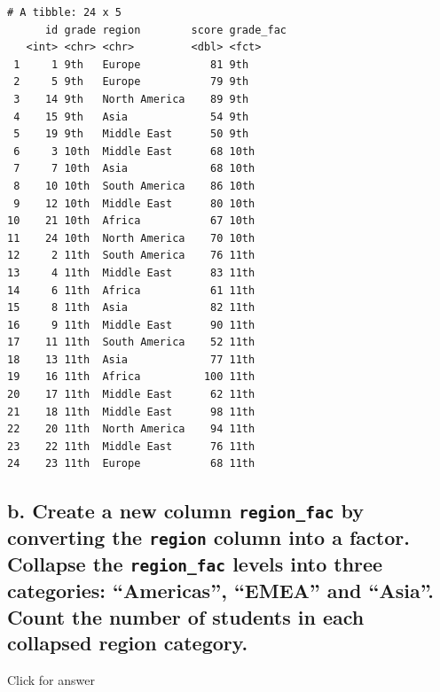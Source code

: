 \documentclass[
]{book}
\begin{document}
\begin{verbatim}
# A tibble: 24 x 5
      id grade region        score grade_fac
   <int> <chr> <chr>         <dbl> <fct>    
 1     1 9th   Europe           81 9th      
 2     5 9th   Europe           79 9th      
 3    14 9th   North America    89 9th      
 4    15 9th   Asia             54 9th      
 5    19 9th   Middle East      50 9th      
 6     3 10th  Middle East      68 10th     
 7     7 10th  Asia             68 10th     
 8    10 10th  South America    86 10th     
 9    12 10th  Middle East      80 10th     
10    21 10th  Africa           67 10th     
11    24 10th  North America    70 10th     
12     2 11th  South America    76 11th     
13     4 11th  Middle East      83 11th     
14     6 11th  Africa           61 11th     
15     8 11th  Asia             82 11th     
16     9 11th  Middle East      90 11th     
17    11 11th  South America    52 11th     
18    13 11th  Asia             77 11th     
19    16 11th  Africa          100 11th     
20    17 11th  Middle East      62 11th     
21    18 11th  Middle East      98 11th     
22    20 11th  North America    94 11th     
23    22 11th  Middle East      76 11th     
24    23 11th  Europe           68 11th     
\end{verbatim}

\hypertarget{b.-create-a-new-column-region_fac-by-converting-the-region-column-into-a-factor.-collapse-the-region_fac-levels-into-three-categories-americas-emea-and-asia.-count-the-number-of-students-in-each-collapsed-region-category.}{%
\subsection{\texorpdfstring{b. Create a new column \texttt{region\_fac} by converting the \texttt{region} column into a factor. Collapse the \texttt{region\_fac} levels into three categories: ``Americas'', ``EMEA'' and ``Asia''. Count the number of students in each collapsed region category.}{b. Create a new column region\_fac by converting the region column into a factor. Collapse the region\_fac levels into three categories: ``Americas'', ``EMEA'' and ``Asia''. Count the number of students in each collapsed region category.}}\label{b.-create-a-new-column-region_fac-by-converting-the-region-column-into-a-factor.-collapse-the-region_fac-levels-into-three-categories-americas-emea-and-asia.-count-the-number-of-students-in-each-collapsed-region-category.}}

Click for answer
\end{document}
